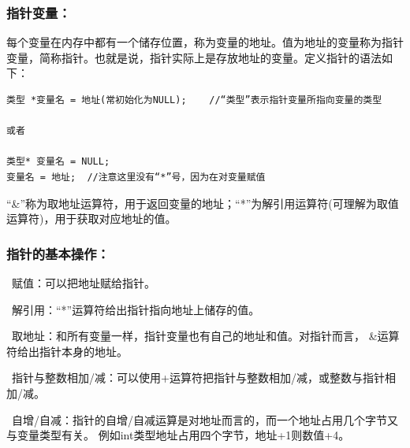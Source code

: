 \documentclass[zihao=-4,UTF8]{report}
\begin{document}
\subsubsection{指针变量：}
每个变量在内存中都有一个储存位置，称为变量的地址。值为地址的变量称为指针变量，简称指针。也就是说，指针实际上是存放地址的变量。定义指针的语法如下：
\begin{lstlisting}
类型 *变量名 = 地址(常初始化为NULL);    //“类型”表示指针变量所指向变量的类型

或者

类型* 变量名 = NULL;
变量名 = 地址;  //注意这里没有“*”号，因为在对变量赋值
\end{lstlisting}\par
{\small\color{gray}“\&”称为取地址运算符，用于返回变量的地址；“*”为解引用运算符(可理解为取值运算符)，用于获取对应地址的值。}

\subsubsection{指针的基本操作：}
\ 赋值：可以把地址赋给指针。\par
{}\ 解引用：“*”运算符给出指针指向地址上储存的值。\par
{}\ 取地址：和所有变量一样，指针变量也有自己的地址和值。对指针而言，
\&运算符给出指针本身的地址。\par
{}\ 指针与整数相加/减：可以使用+运算符把指针与整数相加/减，或整数与指针相加/减。\par
{}\ 自增/自减：指针的自增/自减运算是对地址而言的，而一个地址占用几个字节又与变量类型有关。
{\small\color{gray}例如int类型地址占用四个字节，地址+1则数值+4。}
\end{document}
